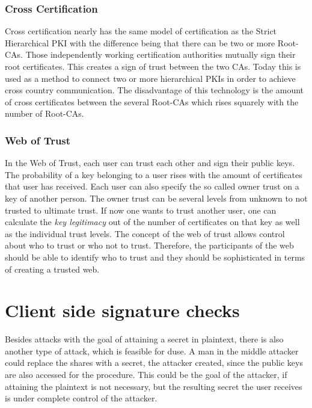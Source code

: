 \subsubsection{Cross Certification}

Cross certification nearly has the same model of certification as the Strict
Hierarchical PKI with the difference being that there can be two or more
Root-CAs. Those independently working certification authorities mutually
sign their root certificates. This creates a sign of trust between the two
CAs. Today this is used as a method to connect two or more hierarchical PKIs
in order to achieve cross country communication. The disadvantage of this
technology is the amount of cross certificates between the several Root-CAs
which rises squarely with the number of Root-CAs.

\subsubsection{Web of Trust}

In the Web of Trust, each user can trust each other and sign their public keys.
The probability of a key belonging to a user rises with the amount of certificates
that user has received. Each user can also specify the so called owner trust on
a key of another person. The owner trust can be several levels from unknown to
not trusted to ultimate trust. If now one wants to trust another user, one can
calculate the \textit{key legitimacy} out of the number of certificates on that
key as well as the individual trust levels. The concept of the web of trust allows
control about who to trust or who not to trust. Therefore, the participants of
the web should be able to identify who to trust and they should be sophisticated
in terms of creating a trusted web.

\section{Client side signature checks}
\label{sec:future:client_sig_check}

Besides attacks with the goal of attaining a secret in plaintext, there is also
another type of attack, which is feasible for duse. A man in the middle
attacker could replace the shares with a secret, the attacker created, since
the public keys are also accessed for the procedure. This could be the goal of
the attacker, if attaining the plaintext is not necessary, but the resulting
secret the user receives is under complete control of the attacker.

